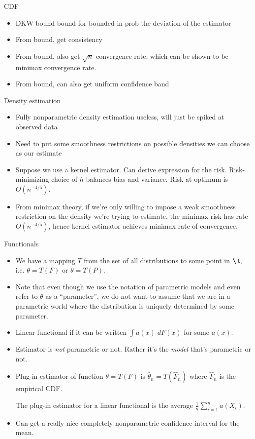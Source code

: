 \documentclass[12pt]{article}
\theoremstyle{plain}
\theoremstyle{definition}
\theoremstyle{remark}
\newcommand{\sumin}{\sum^n_{i=1}}
\begin{document}
CDF
\begin{itemize}
  \item DKW bound bound for bounded in prob the deviation of the
    estimator
  \item From bound, get consistency
  \item From bound, also get $\sqrt{n}$ convergence rate, which can be
    shown to be minimax convergence rate.
  \item From bound, can also get uniform confidence band
\end{itemize}
Density estimation
\begin{itemize}
  \item Fully nonparametric density estimation useless, will just be
    spiked at observed data
  \item Need to put some smoothness restrictions on possible densities
    we can choose as our estimate
  \item Suppose we use a kernel estimator.
    Can derive expression for the risk.
    Risk-minimizing choice of $h$ balances bias and variance.
    Risk at optimum is $O(n^{-4/5})$.
  \item From minimax theory, if we're only willing to impose a weak
    smoothness restriction on the density we're trying to estimate, the
    minimax risk has rate $O(n^{-4/5})$, hence kernel estimator achieves
    minimax rate of convergence.
\end{itemize}
Functionals
\begin{itemize}
  \item We have a mapping $T$ from the set of all distributions to some
    point in $\R$, i.e.  $\theta=T(F)$ or $\theta=T(P)$.
  \item Note that even though we use the notation of parametric models
    and even refer to $\theta$ as a ``parameter'', we do not want to
    assume that we are in a parametric world where the distribution is
    uniquely determined by some parameter.
  \item Linear functional if it can be written
    $\int a(x)\;dF(x)$ for some $a(x)$.
  \item Estimator is \emph{not} parametric or not.
    Rather it's the \emph{model} that's parametric or not.
  \item Plug-in estimator of function $\theta=T(F)$ is
    $\hat{\theta}_n=T(\hat{F}_n)$ where
    $\hat{F}_n$ is the empirical CDF.

    The plug-in estimator for a linear functional is the average
    $\frac{1}{n}\sumin a(X_i)$.
  \item Can get a really nice completely nonparametric confidence
    interval for the mean.
\end{itemize}
\end{document}
